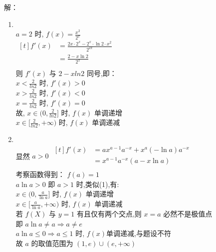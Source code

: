 \documentclass[class=ctexart,crop=false]{standalone}
\begin{document}
解：
\begin{enumerate}[label=(\arabic*)]
	\item \quad\\
	      $a=2$ 时, $f(x)=\frac{x^2}{2^x}$\\
	      $\begin{aligned}[t]
			      f'(x) & =\frac{2x \cdot2^x-2^x\cdot \ln{2}\cdot x^2}{2^{2x}} \\
			            & =\frac{2-x\ln{2}}{2^{x}}                             \\
		      \end{aligned}$\\
	      则 $f'(x)$ 与 $2-xln2$ 同号,即：\\
	      $x<\frac{2}{ln2}$ 时, $f'(x)>0$\\
	      $x>\frac{2}{ln2}$ 时, $f'(x)<0$\\
	      $x=\frac{2}{ln2}$ 时, $f'(x)=0$\\
	      故, $x \in (0,\frac{2}{ln2}]$ 时, $f(x)$ 单调递增\\
$x \in [\frac{2}{ln2},+\infty)$ 时, $f(x)$ 单调递减
	\item \quad\\
显然 $a>0$
$\begin{aligned}[t]
		f'(x) & =ax^{a-1}a^{-x}+x^a(-\ln{a})a^{-x} \\
		      & =x^{a-1}a^{-x}(a-x\ln{a})          \\
	\end{aligned}$\\
考察函数得到： $f(a)=1$\\
$a\ln{a}>0$ 即 $a>1$ 时,类似(1),有:\\
	      $x \in (0,\frac{a}{\ln{a}}]$ 时, $f(x)$ 单调递增\\
$x \in [\frac{a}{\ln{a}},+\infty)$ 时, $f(x)$ 单调递减\\
	      若 $f(X)$ 与 $y=1$ 有且仅有两个交点,则 $x=a$ 必然不是极值点\\
即 $a\ln{a} \neq a \Rightarrow a \neq e$\\
$a\ln{a} \leqslant 0 \Rightarrow a \leqslant 1$ 时,
$f(x)$单调递减,与题设不符\\
故 $a$ 的取值范围为 $(1,e)\cup (e,+\infty)$
\end{enumerate}
\end{document}
